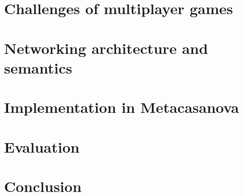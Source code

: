\documentclass[runningheads,a4paper]{llncs}
\begin{document}
\section{Challenges of multiplayer games}


\section{Networking architecture and semantics}


\section{Implementation in Metacasanova}


\section{Evaluation}


\section{Conclusion}




\end{document}
